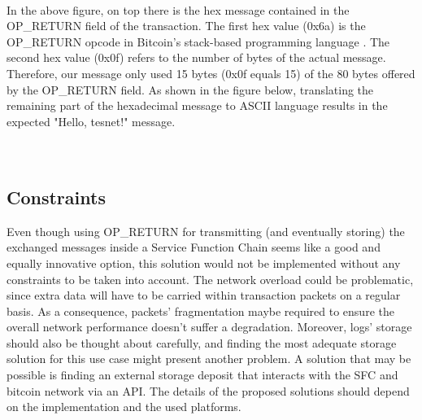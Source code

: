 \\
In the above figure, on top there is the hex message contained in the OP\_RETURN field of the transaction. The first hex value (0x6a) is the OP\_RETURN opcode in Bitcoin's stack-based programming language \cite{wikik}. The second hex value (0x0f) refers to the number of bytes of the actual message.  Therefore, our message only used 15 bytes (0x0f equals 15) of the 80 bytes offered by the OP\_RETURN field. As shown in the figure below, translating the remaining part of the hexadecimal message to ASCII language results in the expected "Hello, tesnet!" message.
\\
\\
\\  

\subsection{Constraints}
Even though using OP\_RETURN for transmitting (and eventually storing) the exchanged messages inside a Service Function Chain seems like a good and equally innovative option, this solution would not be implemented without any constraints to be taken into account. The network overload could be problematic, since extra data will have to be carried within transaction packets on a regular basis. As a consequence, packets' fragmentation maybe required to ensure the overall network performance doesn't suffer a degradation. Moreover, logs' storage should also be thought about carefully, and finding the most adequate storage solution for this use case might present another problem. A solution that may be possible is finding an external storage deposit that interacts with the SFC and bitcoin network via an API. The details of the  proposed solutions should depend on the implementation and the used platforms.  













